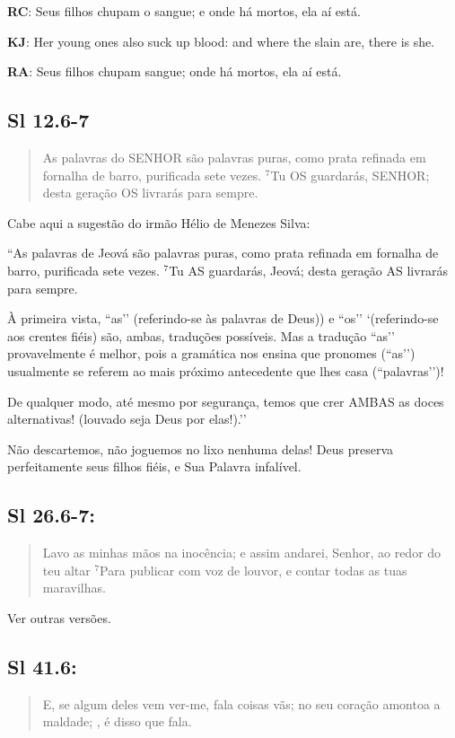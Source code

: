 \textbf{RC}: Seus filhos chupam o sangue; e onde há mortos, ela aí está.

\textbf{KJ}: Her young ones also suck up blood: and where the slain are, there is she.

\textbf{RA}: Seus filhos chupam sangue; onde há mortos, ela aí está.

\subsection*{Sl 12.6-7} 
 \begin{quote}
    \small
As palavras do SENHOR são palavras puras, como prata refinada em fornalha de barro, purificada sete vezes. $^{\mathrm{7}}$Tu OS guardarás, SENHOR; desta geração OS livrarás para sempre.
\end{quote}

Cabe aqui a sugestão do irmão Hélio de Menezes Silva:

``As palavras de Jeová são palavras puras, como prata refinada em fornalha de barro, purificada sete vezes. $^{\mathrm{7}}$Tu AS guardarás, Jeová; desta geração AS livrarás para sempre.

À primeira vista, ``as’’ (referindo-se às palavras de Deus)) e ``os’’
`(referindo-se aos crentes fiéis) são, ambas, traduções possíveis. Mas a
tradução ``as’’ provavelmente é melhor, pois a gramática nos ensina que
pronomes (``as’’) usualmente se referem ao mais próximo antecedente que
lhes casa (``palavras’’)!

De qualquer modo, até mesmo por segurança, temos que crer AMBAS as doces alternativas! (louvado seja Deus por elas!).’’

Não descartemos, não joguemos no lixo nenhuma delas! Deus preserva perfeitamente seus filhos fiéis, e Sua Palavra infalível.

\subsection*{Sl 26.6-7:} 
 \begin{quote}
    \small
Lavo as minhas mãos na inocência; e assim andarei, Senhor, ao redor do teu altar $^{\mathrm{7}}$Para publicar com voz de louvor, e contar todas as tuas maravilhas.
\end{quote}

Ver outras versões. 

\subsection*{Sl 41.6:} 
 \begin{quote}
    \small
 E, se algum deles vem ver-me, fala coisas vãs; no seu coração amontoa a maldade; , é disso que fala.
 \end{quote}
 
